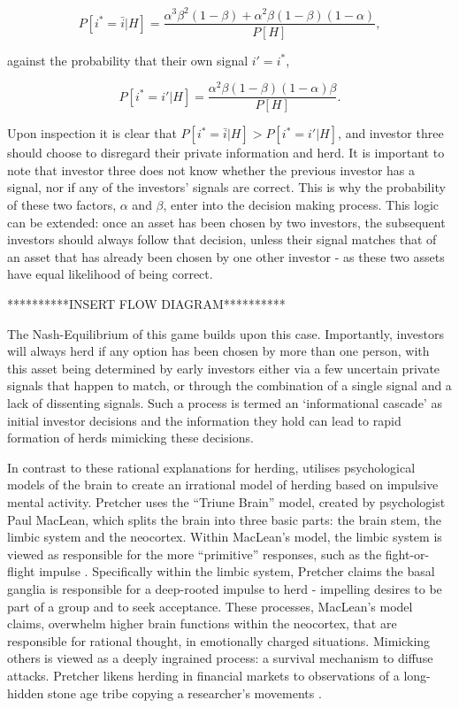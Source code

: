 \documentclass[12pt]{article}
\numberwithin{table}{section}   %
\begin{document}
$$
P[i^*=\bar{i}|H]=\frac{\alpha^3\beta^2(1-\beta)+\alpha^2\beta(1-\beta)(1-\alpha)}{P[H]},
$$

against the probability that their own signal $i'=i^*$,

$$
P[i^*=i'|H]=\frac{\alpha^2\beta(1-\beta)(1-\alpha)\beta}{P[H]}.
$$

Upon inspection it is clear that $P[i^*=\bar{i}|H]>P[i^*=i'|H]$, and investor three should choose to disregard their private information and herd. It is important to note that investor three does not know whether the previous investor has a signal, nor if any of the investors’ signals are correct. This is why the probability of these two factors, $\alpha$ and $\beta$, enter into the decision making process. This logic can be extended: once an asset has been chosen by two investors, the subsequent investors should always follow that decision, unless their signal matches that of an asset that has already been chosen by one other investor - as these two assets have equal likelihood of being correct.

**********INSERT FLOW DIAGRAM**********

The Nash-Equilibrium of this game builds upon this case. Importantly, investors will always herd if any option has been chosen by more than one person, with this asset being determined by early investors either via a few uncertain private signals that happen to match, or through the combination of a single signal and a lack of dissenting signals. Such a process is termed an ‘informational cascade’ as initial investor decisions and the information they hold can lead to rapid formation of herds mimicking these decisions.

In contrast to these rational explanations for herding, \citet{pretcher} utilises psychological models of the brain to create an irrational model of herding based on impulsive mental activity. Pretcher uses the “Triune Brain” model, created by psychologist Paul MacLean, which splits the brain into three basic parts: the brain stem, the limbic system and the neocortex. Within MacLean’s model, the limbic system is viewed as responsible for the more “primitive” responses, such as the fight-or-flight impulse \citep{MacLean}. Specifically within the limbic system, Pretcher claims the basal ganglia is responsible for a deep-rooted impulse to herd - impelling desires to be part of a group and to seek acceptance. These processes, MacLean’s model claims, overwhelm higher brain functions within the neocortex, that are responsible for rational thought, in emotionally charged situations. Mimicking others is viewed as a deeply ingrained process: a survival mechanism to diffuse attacks. Pretcher likens herding in financial markets to observations of a long-hidden stone age tribe copying a researcher’s movements \citep{gajdusek}.
\end{document}
